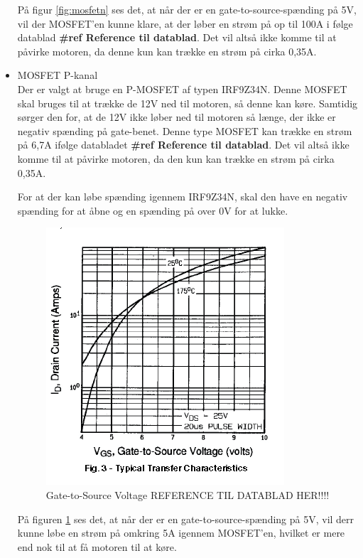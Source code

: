 \begin{itemize}
	På figur \ref{fig:mosfetn} ses det, at når der er en gate-to-source-spænding på 5V, vil der MOSFET'en kunne klare, at der løber en strøm på op til 100A i følge datablad \textbf{\#ref Reference til datablad}. Det vil altså ikke komme til at påvirke motoren, da denne kun kan trække en strøm på cirka 0,35A. 
	
\item MOSFET P-kanal \\
	Der er valgt at bruge en P-MOSFET af typen IRF9Z34N. Denne MOSFET skal bruges til at trække de 12V ned til motoren, så denne kan køre. Samtidig sørger den for, at de 12V ikke løber ned til motoren så længe, der ikke er negativ spænding på gate-benet. 
	Denne type MOSFET kan trække en strøm på 6,7A ifølge databladet \textbf{\#ref Reference til datablad}. Det vil altså ikke komme til at påvirke motoren, da den kun kan trække en strøm på cirka 0,35A. 
	
	For at der kan løbe spænding igennem IRF9Z34N, skal den have en negativ spænding for at åbne og en spænding på over 0V for at lukke. 
		
	\begin{figure}[H]
		\centering
		\includegraphics[width=\textwidth]{DesignOgImplementering/images/grafp}
		\caption{Gate-to-Source Voltage REFERENCE TIL DATABLAD HER!!!!}
		\label{fig:mosfetp}
	\end{figure}
	
	På figuren \ref{fig:mosfetp} ses det, at når der er en gate-to-source-spænding på 5V, vil derr kunne løbe en strøm på omkring 5A igennem MOSFET'en, hvilket er mere end nok til at få motoren til at køre. 
	
\end{itemize}

